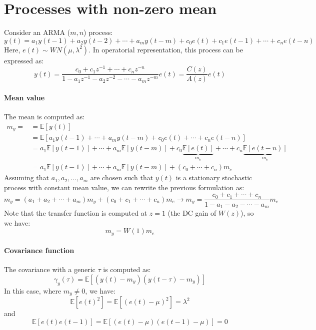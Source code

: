 \section{Processes with non-zero mean}

Consider an ARMA ($m,n$) process:
\[y(t)=a_1y(t-1)+a_2y(t-2)+\cdots+a_m y(t-m)+c_0e(t)+c_1e(t-1)+\cdots+c_n e(t-n) \]
Here, $e(t)\sim WN(\mu,\lambda^2)$.
In operatorial representation, this process can be expressed as:
\[y(t)=\dfrac{c_0+c_1z^{-1}+\cdots+c_n z^{-n}}{1- a_1z^{-1}-a_2z^{-2}-\cdots-a_m z^{-m}}e(t)=\dfrac{C(z)}{A(z)}e(t)\]

\paragraph*{Mean value}
The mean is computed as:
\begin{align*}
    m_y=    &= \mathbb{E}\left[y(t)\right]  \\
            &= \mathbb{E}\left[a_1y(t-1)+\cdots+a_m y(t-m)+c_0e(t)+\cdots+c_n e(t-n)\right] \\
            &= a_1\mathbb{E}\left[y(t-1)\right]+\cdots+a_m\mathbb{E}\left[y(t-m)\right]+c_0\underbrace{\mathbb{E}\left[e(t)\right]}_{m_e} +\cdots+c_n\underbrace{\mathbb{E}\left[e(t-n)\right]}_{m_e} \\
            &= a_1\mathbb{E}\left[y(t-1)\right]+\cdots+a_m\mathbb{E}\left[y(t-m)\right]+\left(c_0 +\cdots+c_n\right)m_e 
\end{align*}
Assuming that $a_1,a_2,\dots,a_m$ are chosen such that $y(t)$ is a stationary stochastic process with constant mean value, we can rewrite the previous formulation as:
\[m_y=\left(a_1+a_2+\cdots+a_m\right)m_y+\left(c_0 +c_1 +\cdots+c_n\right)m_e \rightarrow m_y =\dfrac{c_0 +c_1 +\cdots+c_n}{1-a_1-a_2-\cdots-a_m}m_e\]
Note that the transfer function is computed at $z=1$ (the DC gain of $W(z)$), so we have:
\[m_y=W(1)m_e\]

\paragraph*{Covariance function}
The covariance with a generic $\tau$ is computed as:
\[\gamma_y(\tau)  = \mathbb{E}\left[\left(y(t)-m_y\right)\left(y(t-\tau)-m_y\right)\right]\]
In this case, where $m_y \neq 0$, we have:
\[\mathbb{E}\left[{e(t)}^2\right]=\mathbb{E}\left[{\left(e(t)-\mu\right)}^2\right]= \lambda^2\]
and 
\[\mathbb{E}\left[e(t)e(t-1)\right]=\mathbb{E}\left[\left(e(t)-\mu\right)\left(e(t-1)-\mu\right)\right]= 0\]

